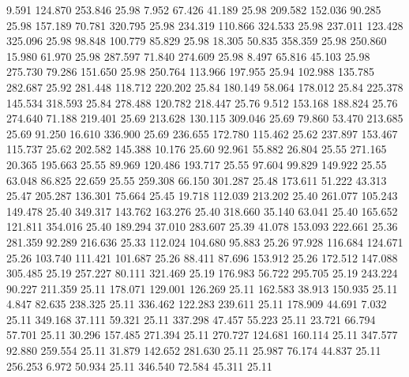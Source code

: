    9.591  124.870  253.846        25.98
   7.952   67.426   41.189        25.98
 209.582  152.036   90.285        25.98
 157.189   70.781  320.795        25.98
 234.319  110.866  324.533        25.98
 237.011  123.428  325.096        25.98
  98.848  100.779   85.829        25.98
  18.305   50.835  358.359        25.98
 250.860   15.980   61.970        25.98
 287.597   71.840  274.609        25.98
   8.497   65.816   45.103        25.98
 275.730   79.286  151.650        25.98
 250.764  113.966  197.955        25.94
 102.988  135.785  282.687        25.92
 281.448  118.712  220.202        25.84
 180.149   58.064  178.012        25.84
 225.378  145.534  318.593        25.84
 278.488  120.782  218.447        25.76
   9.512  153.168  188.824        25.76
 274.640   71.188  219.401        25.69
 213.628  130.115  309.046        25.69
  79.860   53.470  213.685        25.69
  91.250   16.610  336.900        25.69
 236.655  172.780  115.462        25.62
 237.897  153.467  115.737        25.62
 202.582  145.388   10.176        25.60
  92.961   55.882   26.804        25.55
 271.165   20.365  195.663        25.55
  89.969  120.486  193.717        25.55
  97.604   99.829  149.922        25.55
  63.048   86.825   22.659        25.55
 259.308   66.150  301.287        25.48
 173.611   51.222   43.313        25.47
 205.287  136.301   75.664        25.45
  19.718  112.039  213.202        25.40
 261.077  105.243  149.478        25.40
 349.317  143.762  163.276        25.40
 318.660   35.140   63.041        25.40
 165.652  121.811  354.016        25.40
 189.294   37.010  283.607        25.39
  41.078  153.093  222.661        25.36
 281.359   92.289  216.636        25.33
 112.024  104.680   95.883        25.26
  97.928  116.684  124.671        25.26
 103.740  111.421  101.687        25.26
  88.411   87.696  153.912        25.26
 172.512  147.088  305.485        25.19
 257.227   80.111  321.469        25.19
 176.983   56.722  295.705        25.19
 243.224   90.227  211.359        25.11
 178.071  129.001  126.269        25.11
 162.583   38.913  150.935        25.11
   4.847   82.635  238.325        25.11
 336.462  122.283  239.611        25.11
 178.909   44.691    7.032        25.11
 349.168   37.111   59.321        25.11
 337.298   47.457   55.223        25.11
  23.721   66.794   57.701        25.11
  30.296  157.485  271.394        25.11
 270.727  124.681  160.114        25.11
 347.577   92.880  259.554        25.11
  31.879  142.652  281.630        25.11
  25.987   76.174   44.837        25.11
 256.253    6.972   50.934        25.11
 346.540   72.584   45.311        25.11
